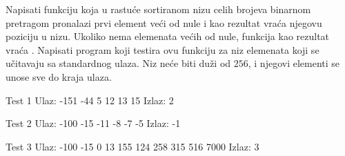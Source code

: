 \begin{Answer}[ref=406]
\end{Answer}
\begin{Exercise}[label=407]
Napisati funkciju koja u rastuće sortiranom nizu celih brojeva
binarnom pretragom pronalazi prvi element veći od nule i kao
rezultat vraća njegovu poziciju u nizu. Ukoliko nema elemenata
većih od nule, funkcija kao rezultat vraća . Napisati
program koji testira ovu funkciju za niz elemenata koji se
učitavaju sa standardnog ulaza. Niz neće biti duži od
$256$, i njegovi elementi se unose sve do kraja ulaza.

\begin{minitest}
\begin{test}{Test 1}
Ulaz:  -151 -44 5 
       12 13 15
Izlaz: 2
\end{test}
\end{minitest}
\begin{minitest}
\begin{test}{Test 2}
Ulaz:  -100 -15 -11 
       -8 -7 -5
Izlaz: -1
\end{test}
\end{minitest}
\begin{minitest}
\begin{test}{Test 3}
Ulaz:  -100 -15 0 13 
       155 124 258 
       315 516 7000
Izlaz: 3
\end{test}
\end{minitest}


\end{Exercise}
